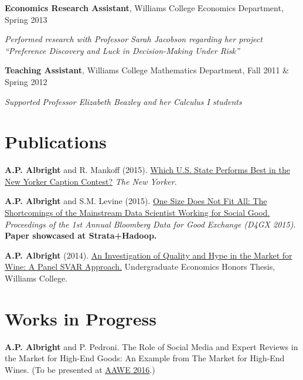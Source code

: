 \documentclass[margin,line]{res}
\begin{document}
\begin{resume}
\vspace{-.1cm}
{\bf Economics Research Assistant},  Williams College Economics Department, Spring 2013 

\vspace{-.43cm}
{\it Performed research with Professor Sarah Jacobson regarding her project ``Preference Discovery and Luck in Decision-Making Under Risk''}

\vspace{-.1cm}
{\bf Teaching Assistant},  Williams College Mathematics Department, Fall 2011 \& Spring 2012

\vspace{-.43cm}
{\it Supported Professor Elizabeth Beazley and her Calculus I students}

\section{\sc Publications}

{\bf A.P. Albright} and R. Mankoff (2015). \href{http://www.newyorker.com/culture/culture-desk/which-u-s-state-performs-best-in-the-new-yorker-caption-contest?intcid=popular} {Which U.S. State Performs Best in the New Yorker Caption Contest?}  {\it The New Yorker}. 

\vspace{-.3cm}
{\bf A.P. Albright} and S.M. Levine (2015). \href{https://thelittledataset.files.wordpress.com/2015/09/albright-levine-one-size-does-not-fit-all.pdf}{One Size Does Not Fit All: The Shortcomings of the Mainstream Data Scientist Working for Social Good.} {\it Proceedings of the 1st Annual Bloomberg Data for Good Exchange (D4GX 2015)}. {\bf Paper showcased at Strata+Hadoop.} 

\vspace{-.3cm}
{\bf A.P. Albright} (2014). \href{https://thelittledataset.files.wordpress.com/2015/01/thesisposter.png}{An Investigation of Quality and Hype in the Market for Wine: A Panel SVAR Approach.} Undergraduate Economics Honors Thesis, Williams College. 

\section{\sc Works in Progress}
{\bf A.P. Albright} and P. Pedroni. The Role of Social Media and Expert Reviews in the Market for High-End Goods: An Example from The Market for High-End Wines. (To be presented at \href{http://www.wine-economics.org/2016-bordeaux/}{AAWE 2016}.) 


\end{resume}
\end{document}
